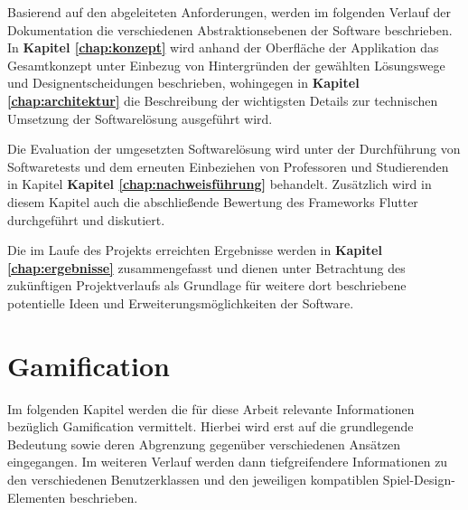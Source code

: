 \documentclass[bibliography=totoc,listof=totoc,BCOR=5mm,DIV=12,oneside]{scrbook}
\begin{document}
\par \bigskip Basierend auf den abgeleiteten Anforderungen, werden im folgenden Verlauf der Dokumentation die verschiedenen Abstraktionsebenen der Software beschrieben. In \textbf{Kapitel \ref{chap:konzept}} wird anhand der Oberfläche der Applikation das Gesamtkonzept unter Einbezug von Hintergründen der gewählten Lösungswege und Designentscheidungen beschrieben, wohingegen in \textbf{Kapitel \ref{chap:architektur}} die Beschreibung der wichtigsten Details zur technischen Umsetzung der Softwarelösung ausgeführt wird.

\par \bigskip Die Evaluation der umgesetzten Softwarelösung wird unter der Durchführung von Softwaretests und dem erneuten Einbeziehen von Professoren und Studierenden in Kapitel \textbf{Kapitel \ref{chap:nachweisführung}} behandelt. Zusätzlich wird in diesem Kapitel auch die abschließende Bewertung des Frameworks Flutter durchgeführt und diskutiert.

\par \bigskip Die im Laufe des Projekts erreichten Ergebnisse werden in \textbf{Kapitel \ref{chap:ergebnisse}} zusammengefasst und dienen unter Betrachtung des zukünftigen Projektverlaufs als Grundlage für weitere dort beschriebene potentielle Ideen und Erweiterungsmöglichkeiten der Software.

\newpage
\section{Gamification} 
\label{sec:grundlagenkapitelGamification}
\par Im folgenden Kapitel werden die für diese Arbeit relevante Informationen bezüglich Gamification vermittelt. Hierbei wird erst auf die grundlegende Bedeutung sowie deren Abgrenzung gegenüber verschiedenen Ansätzen eingegangen. Im weiteren Verlauf werden dann tiefgreifendere Informationen zu den verschiedenen Benutzerklassen und den jeweiligen kompatiblen Spiel-Design-Elementen beschrieben.
\end{document}
